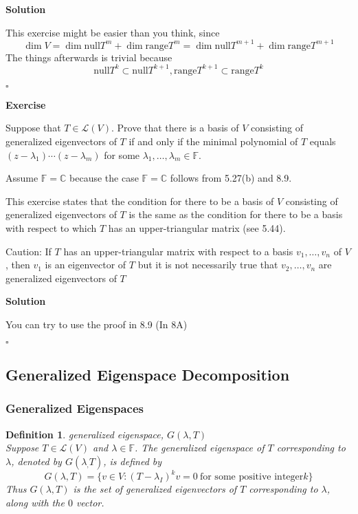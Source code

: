 \documentclass{article}
\newtheorem{definition}{Definition}[subsection]
\newenvironment{exercise}{%
{\textbf{Exercise\\}
    }
}{
}
\newenvironment{solution}{%
{
    \textbf{Solution\\}
    }
}{
  \hfill $\square$ 
  \par\bigskip 
}
\newcommand{\CC}{\mathbb{C}}
\newcommand{\FF}{\mathbb{F}}
\newcommand{\range}{\text{range}}
\newcommand{\n}{\text{null}}
\begin{document}
\begin{CJK}{UTF8}{gkai}
\begin{solution}
    This exercise might be easier than you think, since
    \[\dim V = \dim \n T^m + \dim \range T^m = \dim \n T^{m+ 1} + \dim \range T^{m + 1}\]
    The things afterwards is trivial because
    \[\n T^k \subset \n T^{k + 1}, \range T^{k + 1} \subset \range T^k\]
\end{solution}

\begin{exercise}
    Suppose that $T \in \mathcal{L}(V)$. Prove that there is a basis of $V$ consisting of generalized eigenvectors of $T$ if and only if the minimal polynomial of $T$ equals $(z - \lambda_1)\cdots(z - \lambda_m)$ for some $\lambda_1,\ldots, \lambda_m \in \FF$.

    Assume $\FF = \CC$ because the case $\FF = \CC$ follows from 5.27(b) and 8.9.

    This exercise states that the condition for there to be a basis of $V$ consisting of generalized eigenvectors of $T$ is the same as the condition for there to be a basis with respect to which $T$ has an upper-triangular matrix (see 5.44).

    Caution: If $T$ has an upper-triangular matrix with respect to a basis $v_1, \ldots,v_n$ of $V$, then $v_1$ is an eigenvector of $T$ but it is not necessarily true that $v_2,\ldots,v_n$ are generalized eigenvectors of $T$
\end{exercise}

\begin{solution}
    You can try to use the proof in 8.9 (In 8A)    
\end{solution}


\subsection{Generalized Eigenspace Decomposition}

\subsubsection{Generalized Eigenspaces}
\begin{definition}
    generalized eigenspace, $G(\lambda,T)$\\

    Suppose $T \in \mathcal{L}(V)$ and $\lambda \in \FF$. The generalized eigenspace of $T$ corresponding to $\lambda$, denoted by $G(\lambda_,T)$, is defined by
    \[G(\lambda,T) = \{v \in V : (T - \lambda_I)^k v = 0 ~ \text{for some positive integer} k\}\]
    Thus $G(\lambda,T)$ is the set of generalized eigenvectors of $T$ corresponding to $\lambda$, along with the $0$ vector.
\end{definition}


\end{CJK}
\end{document}
